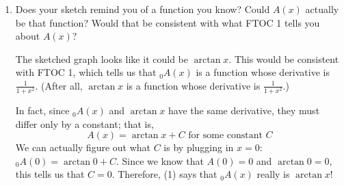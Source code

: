 \documentclass[main]{subfiles}
\begin{document}
\begin{enumerate}[resume]
\begin{enumerate}
\begin{enumerate}
    \begin{solution}
      We've seen that $A(0) = 0$; $A$ is always increasing; and
      $A$ is concave up on $(-\infty, 0)$ and concave down on $(0,
      \infty)$.  Therefore, its graph looks roughly like this:
      \begin{center}
      \end{center}
    \end{solution}

  \item


    \begin{problem}[\stretch{0.5}]
      Does your sketch remind you of a function you know?  Could 
      $A(x)$ actually be that function? Would that be consistent with
      what FTOC 1 tells you about $A(x)$?
    \end{problem}

    \begin{solution}
      The sketched graph looks like it could be $\arctan x$.  This would
      be consistent with FTOC 1, which tells us that $_0 A(x)$ is a
      function whose derivative is $\frac{1}{1 + x^2}$.  (After all,
      $\arctan x$ is a function whose derivative is $\frac{1}{1 + x^2}$.)

      In fact, since $_0 A(x)$ and $\arctan x$ have the same derivative,
      they must differ only by a constant; that is,
      \begin{equation}
        A(x) = \arctan x + C \text{ for some constant $C$}
      \end{equation}
      We can actually figure out what $C$ is by plugging in $x = 0$: $_0
      A(0) = \arctan 0 + C$.  Since we know that $A(0) = 0$ and
      $\arctan 0 = 0$, this tells us that $C = 0$.  Therefore,
      (1) says that $_0 A(x)$ really is $\arctan x$!  
    \end{solution}
    \end{enumerate}


\end{enumerate}
\end{enumerate}
\end{document}
